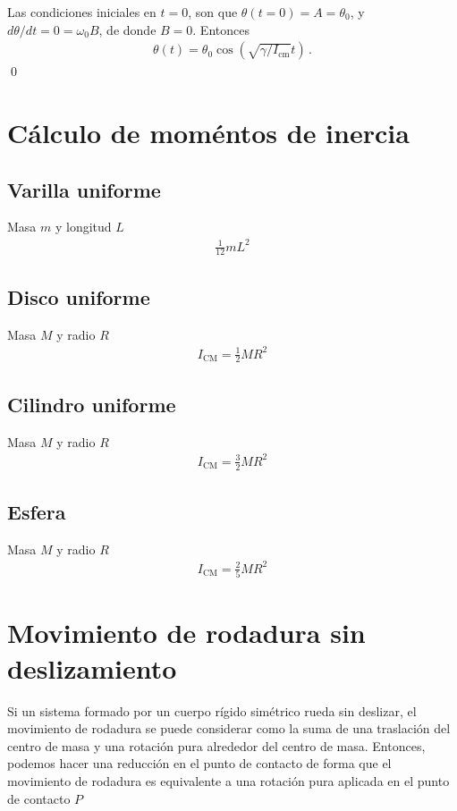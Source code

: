 Las condiciones iniciales en $t=0$, son que $\theta(t=0)=A=\theta_0$, y $d\theta/dt=0=\omega_0B$, de donde $B=0$. Entonces
\begin{align}
   \theta(t)=\theta_0\cos\left(\sqrt{\gamma/I_{\text{cm}}} t \right)\,.
\end{align}
\qed

\section{Cálculo de moméntos de inercia}

\subsection{Varilla uniforme}
Masa $m$ y longitud $L$
\begin{align}
  \frac{1}{12}mL^2
\end{align}

\subsection{Disco uniforme}
Masa $M$ y radio $R$
\begin{align}
  I_{\text{CM}}=\frac{1}{2}MR^2
\end{align}
\subsection{Cilindro uniforme}
Masa $M$ y radio $R$
\begin{align}
\label{eq:Icmcil}
  I_{\text{CM}}=\frac{3}{2}MR^2
\end{align}

\subsection{Esfera}
Masa $M$ y radio $R$
\begin{align}
  I_{\text{CM}}=\frac{2}{5}MR^2
\end{align}



\section{Movimiento de rodadura sin deslizamiento}

Si un sistema formado por un cuerpo rígido simétrico rueda sin
deslizar, el movimiento de rodadura se puede considerar como la suma de
una traslación del centro de masa y una rotación pura alrededor del
centro de masa. 
Entonces, podemos hacer una reducción en el punto de contacto de forma
que el movimiento de rodadura es equivalente a una rotación pura
aplicada en el punto de contacto $P$



